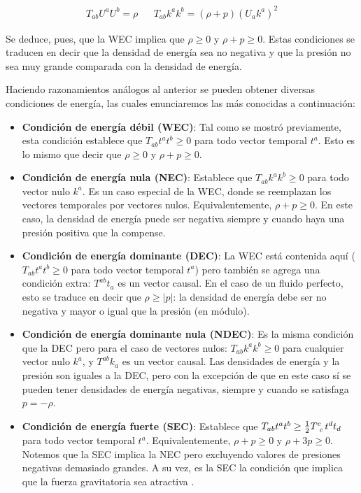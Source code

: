 \begin{align*}
    T_{ab}U^aU^b=\rho&   & T_{ab}k^ak^b=(\rho+p)(U_ak^a)^2
\end{align*}

Se deduce, pues, que la WEC implica que $\rho\geq0$ y $\rho+p\geq0$. Estas condiciones se traducen en decir que la densidad de energía sea no negativa y que la presión no sea muy grande comparada con la densidad de energía.

Haciendo razonamientos análogos al anterior se pueden obtener diversas condiciones de energía, las cuales enunciaremos las más conocidas a continuación:


\begin{itemize}
    \item \textbf{Condición de energía débil (WEC)}: Tal como se mostró previamente, esta condición establece que $T_{ab}t^at^b\geq0$ para todo vector temporal $t^a$. Esto es lo mismo que decir que $\rho\geq0$ y $\rho+p\geq0$.
    \item \textbf{Condición de energía nula (NEC)}: Establece que $T_{ab}k^ak^b\geq0$ para todo vector nulo $k^a$. Es un caso especial de la WEC, donde se reemplazan los vectores temporales por vectores nulos. Equivalentemente, $\rho+p\geq0$. En este caso, la densidad de energía puede ser negativa siempre y cuando haya una presión positiva que la compense.
    \item \textbf{Condición de energía dominante (DEC)}: La WEC está contenida aquí ($T_{ab}t^at^b\geq0$ para todo vector temporal $t^a$) pero también se agrega una condición extra: $T^{ab}t_a$ es un vector causal. En el caso de un fluido perfecto, esto se traduce en decir que $\rho\geq|p|$: la densidad de energía debe ser no negativa y mayor o igual que la presión (en módulo).
    \item \textbf{Condición de energía dominante nula (NDEC)}: Es la misma condición que la DEC pero para el caso de vectores nulos: $T_{ab}k^ak^b\geq0$ para cualquier vector nulo $k^a$, y $T^{ab}k_a$ es un vector causal. Las densidades de energía y la presión son iguales a la DEC, pero con la excepción de que en este caso sí se pueden tener densidades de energía negativas, siempre y cuando se satisfaga $p=-\rho$.
    \item \textbf{Condición de energía fuerte (SEC)}: Establece que $T_{ab}t^at^b\geq\frac{1}{2}\tensor{T}{^c_c}t^dt_d$ para todo vector temporal $t^a$. Equivalentemente, $\rho+p\geq0$ y $\rho+3p\geq0$. Notemos que la SEC implica la NEC pero excluyendo valores de presiones negativas demasiado grandes. A su vez, es la SEC la condición que implica que la fuerza gravitatoria sea atractiva \citep{Carroll}.
\end{itemize}

